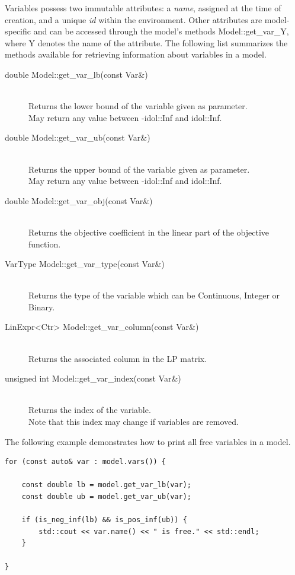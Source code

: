 Variables possess two immutable attributes: a \emph{name}, assigned at the
time of creation, and a unique \emph{id} within the environment. Other
attributes are model-specific and can be accessed through the model's methods
\textsf{Model::get\_var\_Y}, where \textsf{Y} denotes the name of the
attribute. The following list summarizes the methods available for retrieving
information about variables in a model.
%
\begin{description}
    \item[\textsf{double Model::get\_var\_lb(const Var\&)}]\hphantom{.}\\
    Returns the lower bound of the variable given as parameter. \\
    May return any value between \textsf{-idol::Inf} and \textsf{idol::Inf}.
    \item[\textsf{double Model::get\_var\_ub(const Var\&)}]\hphantom{.}\\
    Returns the upper bound of the variable given as parameter. \\ 
    May return any value between \textsf{-idol::Inf} and \textsf{idol::Inf}.
    \item[\textsf{double Model::get\_var\_obj(const Var\&)}]\hphantom{.}\\
    Returns the objective coefficient in the linear part of the objective
    function.
    \item[\textsf{VarType Model::get\_var\_type(const Var\&)}]\hphantom{.}\\
    Returns the type of the variable which can be \textsf{Continuous},
    \textsf{Integer} or \textsf{Binary}.
    \item[\textsf{LinExpr<Ctr> Model::get\_var\_column(const Var\&)}]\hphantom{.}\\
    Returns the associated column in the LP matrix.
    \item[\textsf{unsigned int Model::get\_var\_index(const Var\&)}]\hphantom{.}\\
    Returns the index of the variable. \\ 
    Note that this index may change if variables are removed.
\end{description}

The following example demonstrates how to print all free variables in a model.
%
\begin{lstlisting}
for (const auto& var : model.vars()) {

    const double lb = model.get_var_lb(var);
    const double ub = model.get_var_ub(var);

    if (is_neg_inf(lb) && is_pos_inf(ub)) {
        std::cout << var.name() << " is free." << std::endl;
    }

}
\end{lstlisting}

